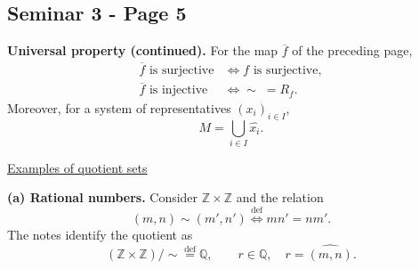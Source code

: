 
\subsection*{Seminar 3 - Page 5}
\begingroup
\setlength{\abovedisplayskip}{5pt}
\setlength{\belowdisplayskip}{5pt}
\setlength{\abovedisplayshortskip}{3pt}
\setlength{\belowdisplayshortskip}{3pt}

\noindent\textbf{Universal property (continued).}
For the map $\overline f$ of the preceding page,
\[
\begin{aligned}
 \overline f\text{ is surjective}
   &\iff f\text{ is surjective},\\
 \overline f\text{ is injective}
   &\iff {\sim}\;=R_f.
\end{aligned}
\]
Moreover, for a system of representatives $(x_i)_{i\in I}$,
\[
 M=\bigcup_{i\in I}\widehat{x_i}.
\]

\medskip
\noindent\underline{Examples of quotient sets}

\noindent\textbf{(a) Rational numbers.}
Consider $\mathbb Z\times\mathbb Z$ and the relation
\[
 (m,n)\sim(m',n')
 \overset{\mathrm{def}}{\iff}mn'=nm'.
\]
The notes identify the quotient as
\[
 (\mathbb Z\times\mathbb Z)/{\sim}
   \overset{\mathrm{def}}{=}\mathbb Q,
 \qquad
 r\in\mathbb Q,\quad r=\widehat{(m,n)}.
\]

